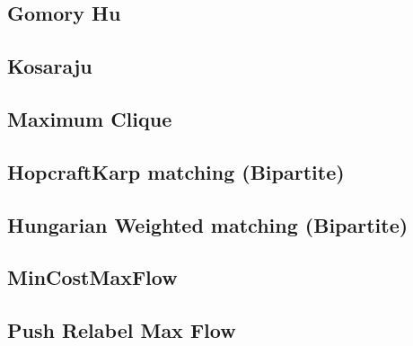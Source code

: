 \subsection{Gomory Hu}
\vspace{-2ex}
\raggedbottom
\vspace{-3.2ex}
\hrulefill
\subsection{Kosaraju}
\vspace{-2ex}
\raggedbottom
\vspace{-3.2ex}
\hrulefill
\subsection{Maximum Clique}
\vspace{-2ex}
\raggedbottom
\vspace{-3.2ex}
\hrulefill
\subsection{HopcraftKarp matching (Bipartite)}
\vspace{-2ex}
\raggedbottom
\vspace{-3.2ex}
\hrulefill
\subsection{Hungarian Weighted matching (Bipartite)}
\vspace{-2ex}
\raggedbottom
\vspace{-3.2ex}
\hrulefill
\subsection{MinCostMaxFlow}
\vspace{-2ex}
\raggedbottom
\vspace{-3.2ex}
\hrulefill
\subsection{Push Relabel Max Flow}
\vspace{-2ex}
\raggedbottom
\vspace{-3.2ex}
\hrulefill
